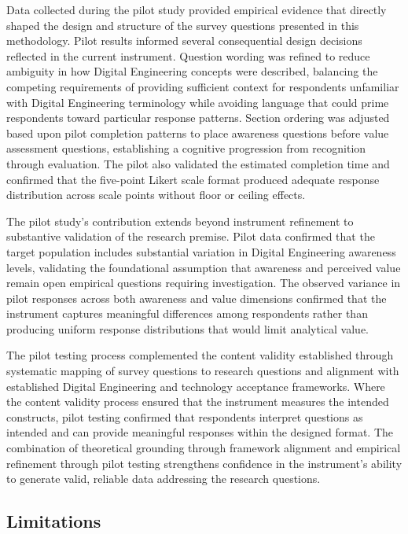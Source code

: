 Data collected during the pilot study provided empirical evidence that directly shaped the design and structure of the survey questions presented in this methodology. Pilot results informed several consequential design decisions reflected in the current instrument. Question wording was refined to reduce ambiguity in how Digital Engineering concepts were described, balancing the competing requirements of providing sufficient context for respondents unfamiliar with Digital Engineering terminology while avoiding language that could prime respondents toward particular response patterns. Section ordering was adjusted based upon pilot completion patterns to place awareness questions before value assessment questions, establishing a cognitive progression from recognition through evaluation. The pilot also validated the estimated completion time and confirmed that the five-point Likert scale format produced adequate response distribution across scale points without floor or ceiling effects.

The pilot study's contribution extends beyond instrument refinement to substantive validation of the research premise. Pilot data confirmed that the target population includes substantial variation in Digital Engineering awareness levels, validating the foundational assumption that awareness and perceived value remain open empirical questions requiring investigation. The observed variance in pilot responses across both awareness and value dimensions confirmed that the instrument captures meaningful differences among respondents rather than producing uniform response distributions that would limit analytical value.

The pilot testing process complemented the content validity established through systematic mapping of survey questions to research questions and alignment with established Digital Engineering and technology acceptance frameworks. Where the content validity process ensured that the instrument measures the intended constructs, pilot testing confirmed that respondents interpret questions as intended and can provide meaningful responses within the designed format. The combination of theoretical grounding through framework alignment and empirical refinement through pilot testing strengthens confidence in the instrument's ability to generate valid, reliable data addressing the research questions.

\subsection{Limitations}

